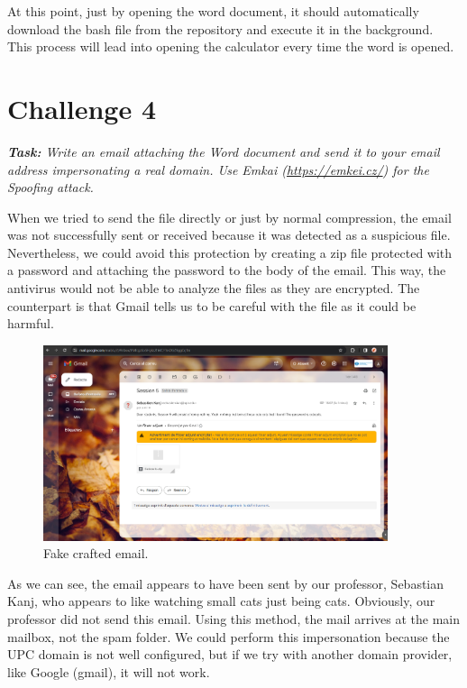 At this point, just by opening the word document, it should automatically download the bash file from the repository and execute it in the background. This process will lead into opening the calculator every time the word is opened.


\section{Challenge 4}

\textit{\textbf{Task:} Write an email attaching the Word document and send it to your email address impersonating a real domain. Use Emkai (\href{https://emkei.cz/}{https://emkei.cz/}) for the Spoofing attack.}

When we tried to send the file directly or just by normal compression, the email was not successfully sent or received because it was detected as a suspicious file. Nevertheless, we could avoid this protection by creating a zip file protected with a password and attaching the password to the body of the email. This way, the antivirus would not be able to analyze the files as they are encrypted. The counterpart is that Gmail tells us to be careful with the file as it could be harmful.

\begin{figure}[H]
    \centering
    \includegraphics[width=0.9\textwidth]{Images/Email.png}
    \caption{Fake crafted email.}
    \label{fig:fake_email}
\end{figure}
\vspace{-0.5cm}

As we can see, the email appears to have been sent by our professor, Sebastian Kanj, who appears to like watching small cats just being cats. Obviously, our professor did not send this email. Using this method, the mail arrives at the main mailbox, not the spam folder. We could perform this impersonation because the UPC domain is not well configured, but if we try with another domain provider, like Google (gmail), it will not work.